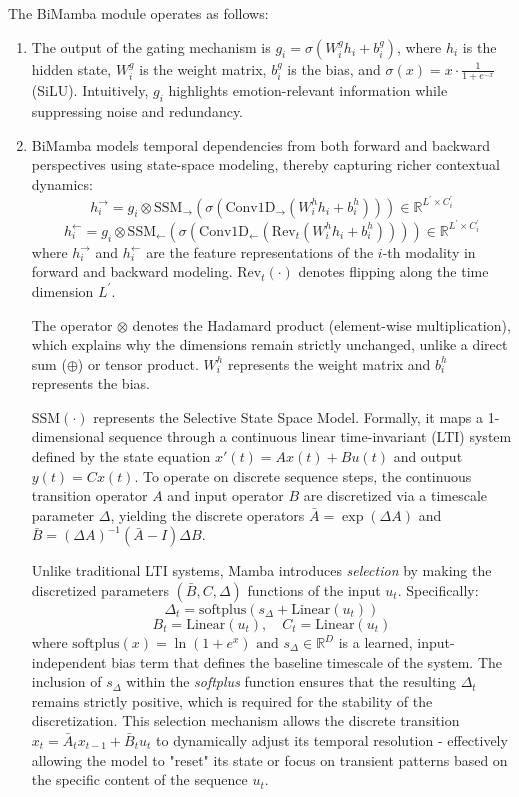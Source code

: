 \documentclass[11pt,a4paper]{article}
\newcommand{\R}{\mathbb{R}}
\begin{document}
	The BiMamba module operates as follows:
	\begin{enumerate}
		\item The output of the gating mechanism is $g_{i}=\sigma(W_{i}^{g}h_{i}+b_{i}^{g})$, where $h_{i}$ is the hidden state, $W_{i}^{g}$ is the weight matrix, $b_{i}^{g}$ is the bias, and $\displaystyle \sigma(x)=x\cdot\frac{1}{1+e^{-x}}$ (SiLU). Intuitively, $g_{i}$ highlights emotion-relevant information while suppressing noise and redundancy.
		
		\item BiMamba models temporal dependencies from both forward and backward perspectives using state-space modeling, thereby capturing richer contextual dynamics:
		$$h_{i}^{\rightarrow}=g_{i}\otimes \text{SSM}_{\rightarrow}(\sigma(\text{Conv1D}_{\rightarrow}(W_{i}^{h}h_{i}+b_{i}^{h})))\in\R^{L^{\prime}\times C_{i}^{\prime}}$$
		$$h_{i}^{\leftarrow}=g_{i}\otimes \text{SSM}_{\leftarrow}(\sigma(\text{Conv1D}_{\leftarrow}(\text{Rev}_{t}(W_{i}^{h}h_{i}+b_{i}^{h}))))\in\R^{L^{\prime}\times C_{i}^{\prime}}$$
		where $h_{i}^{\rightarrow}$ and $h_{i}^{\leftarrow}$ are the feature representations of the $i$-th modality in forward and backward modeling. $\text{Rev}_{t}(\cdot)$ denotes flipping along the time dimension $L^{\prime}$.
		
		The operator $\otimes$ denotes the Hadamard product (element-wise multiplication), which explains why the dimensions remain strictly unchanged, unlike a direct sum ($\oplus$) or tensor product. $W_{i}^{h}$ represents the weight matrix and $b_{i}^{h}$ represents the bias. 
		
		$\text{SSM}(\cdot)$ represents the Selective State Space Model. Formally, it maps a 1-dimensional sequence through a continuous linear time-invariant (LTI) system defined by the state equation $x'(t) = A x(t) + B u(t)$ and output $y(t) = C x(t)$. To operate on discrete sequence steps, the continuous transition operator $A$ and input operator $B$ are discretized via a timescale parameter $\Delta$, yielding the discrete operators $\bar{A} = \exp(\Delta A)$ and $\bar{B} = (\Delta A)^{-1}(\bar{A} - I)\Delta B$. 
		
		Unlike traditional LTI systems, Mamba introduces \textit{selection} by making the discretized parameters $(\bar{B}, C, \Delta)$ functions of the input $u_t$. Specifically:
		$$ \Delta_t = \text{softplus}(s_{\Delta} + \text{Linear}(u_t)) $$
		$$ B_t = \text{Linear}(u_t), \quad C_t = \text{Linear}(u_t) $$
		where $ \text{softplus}(x) = \ln(1 + e^x) \text{ and } s_{\Delta} \in \mathbb{R}^{D} $ is a learned, input-independent bias term that defines the baseline timescale of the system. The inclusion of $s_{\Delta}$ within the \textit{softplus} function ensures that the resulting $\Delta_t$ remains strictly positive, which is required for the stability of the discretization. This selection mechanism allows the discrete transition $x_t = \bar{A}_t x_{t-1} + \bar{B}_t u_t$ to dynamically adjust its temporal resolution - effectively allowing the model to "reset" its state or focus on transient patterns based on the specific content of the sequence $u_t$.
		

\end{enumerate}
\end{document}
